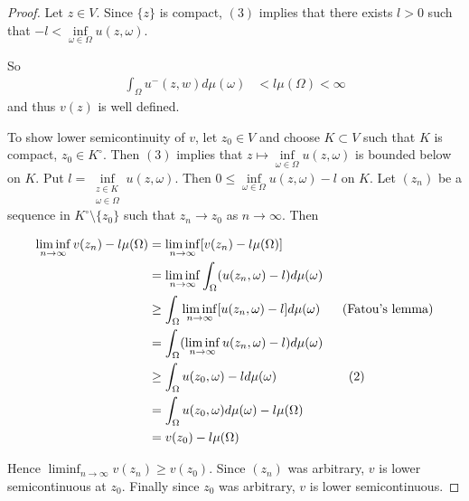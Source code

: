 \documentclass[12pt]{amsart}
\theoremstyle{definition}
\theoremstyle{remark}
\theoremstyle{definition}
\begin{document}
\begin{proof}

Let $z \in V$. Since $\{z\}$ is compact, $(3)$ implies that there exists $l> 0$ such that $ -l < \inf\limits_{\omega \in \Omega} u(z,\omega)$. 

So 
\begin{align*}
\int_{\Omega}u^{-}(z,w)d\mu(\omega) 
&< l \mu(\Omega) < \infty
\end{align*} and thus $v(z)$ is well defined.

To show lower semicontinuity of $v$, let $z_0 \in V$ and choose $K \subset V$ such that $K$ is compact, $z_0 \in K^{\circ}$. Then $(3)$ implies that $z \mapsto \inf\limits_{\omega \in \Omega}u(z, \omega)$ is bounded below on $K$. Put $l = \inf\limits_{\substack{z \in K\\ \omega \in \Omega}}u(z, \omega)$. Then $0 \leq \inf\limits_{\omega \in \Omega}u(z, \omega) - l$ on $K$. Let $(z_n)$ be a sequence in $K^{\circ}\setminus\{z_0\}$ such that $z_n \rightarrow z_0$ as $n \rightarrow \infty$.
Then 

\begin{align*}
\liminf_{n \rightarrow \infty}v(z_n) - l\mu(\Omega) 
&= \liminf_{n \rightarrow \infty}[v(z_n) - l\mu(\Omega)]\\
&= \liminf_{n \rightarrow \infty}\int_{\Omega}(u(z_n,\omega) - l)d\mu(\omega)\\
&\geq \int_{\Omega}\liminf_{n \rightarrow \infty}[u(z_n,\omega) - l]d\mu(\omega) \hspace{5mm} \text{ (Fatou's lemma)}\\
&= \int_{\Omega}(\liminf_{n \rightarrow \infty}u(z_n,\omega) - l)d\mu(\omega)\\
&\geq \int_{\Omega}u(z_0,\omega) -ld\mu(\omega) \hspace{20mm} (2)\\
&= \int_{\Omega}u(z_0,\omega) d\mu(\omega) - l\mu(\Omega)\\
&= v(z_0) - l\mu(\Omega)
\end{align*}

Hence $\liminf_{n \rightarrow \infty}v(z_n) \geq v(z_0)$. Since $(z_n)$ was arbitrary, $v$ is lower semicontinuous at $z_0$. Finally since $z_0$ was arbitrary, $v$ is lower semicontinuous.


\end{proof}
\end{document}
